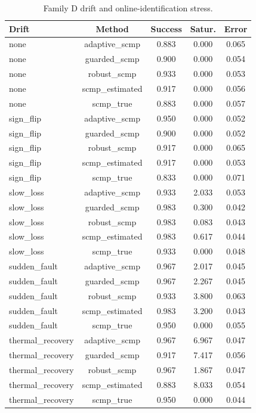 \begin{table}[t]
\centering
\small
\caption{Family D drift and online-identification stress.}
\label{tab:drift}
\begin{tabular}{lcccc}
\toprule
Drift & Method & Success & Satur. & Error \\
\midrule
none & adaptive\_scmp & 0.883 & 0.000 & 0.065 \\
none & guarded\_scmp & 0.900 & 0.000 & 0.054 \\
none & robust\_scmp & 0.933 & 0.000 & 0.053 \\
none & scmp\_estimated & 0.917 & 0.000 & 0.056 \\
none & scmp\_true & 0.883 & 0.000 & 0.057 \\
sign\_flip & adaptive\_scmp & 0.950 & 0.000 & 0.052 \\
sign\_flip & guarded\_scmp & 0.900 & 0.000 & 0.052 \\
sign\_flip & robust\_scmp & 0.917 & 0.000 & 0.065 \\
sign\_flip & scmp\_estimated & 0.917 & 0.000 & 0.053 \\
sign\_flip & scmp\_true & 0.833 & 0.000 & 0.071 \\
slow\_loss & adaptive\_scmp & 0.933 & 2.033 & 0.053 \\
slow\_loss & guarded\_scmp & 0.983 & 0.300 & 0.042 \\
slow\_loss & robust\_scmp & 0.983 & 0.083 & 0.043 \\
slow\_loss & scmp\_estimated & 0.983 & 0.617 & 0.044 \\
slow\_loss & scmp\_true & 0.933 & 0.000 & 0.048 \\
sudden\_fault & adaptive\_scmp & 0.967 & 2.017 & 0.045 \\
sudden\_fault & guarded\_scmp & 0.967 & 2.267 & 0.045 \\
sudden\_fault & robust\_scmp & 0.933 & 3.800 & 0.063 \\
sudden\_fault & scmp\_estimated & 0.983 & 3.200 & 0.043 \\
sudden\_fault & scmp\_true & 0.950 & 0.000 & 0.055 \\
thermal\_recovery & adaptive\_scmp & 0.967 & 6.967 & 0.047 \\
thermal\_recovery & guarded\_scmp & 0.917 & 7.417 & 0.056 \\
thermal\_recovery & robust\_scmp & 0.967 & 1.867 & 0.047 \\
thermal\_recovery & scmp\_estimated & 0.883 & 8.033 & 0.054 \\
thermal\_recovery & scmp\_true & 0.950 & 0.000 & 0.044 \\
\bottomrule
\end{tabular}
\end{table}
